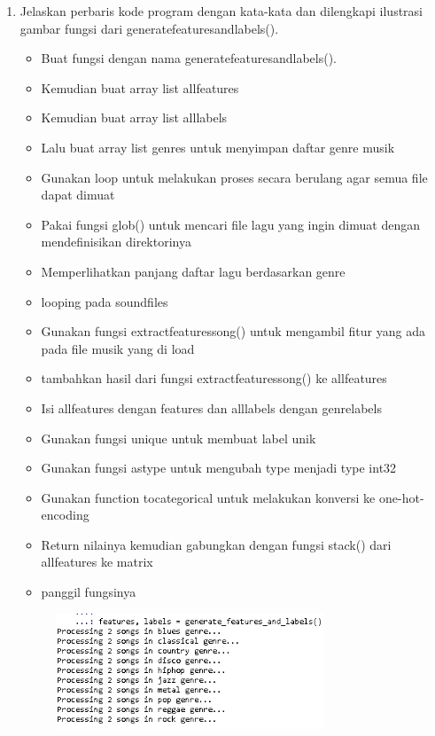 \begin{enumerate}
	\item Jelaskan perbaris kode program dengan kata-kata dan dilengkapi ilustrasi gambar fungsi dari generatefeaturesandlabels().
	\hfill\break
	
	\begin{itemize}
		\item Buat fungsi dengan nama generatefeaturesandlabels().
		\item Kemudian buat array list allfeatures
		\item Kemudian buat array list alllabels
		\item Lalu buat array list genres untuk menyimpan daftar genre musik
		\item Gunakan loop untuk melakukan proses secara berulang agar semua file dapat dimuat
		\item Pakai fungsi glob() untuk mencari file lagu yang ingin dimuat dengan mendefinisikan direktorinya
		\item Memperlihatkan panjang daftar lagu berdasarkan genre
		\item looping pada soundfiles
		\item Gunakan fungsi extractfeaturessong() untuk mengambil fitur yang ada pada file musik yang di load
		\item tambahkan hasil dari fungsi extractfeaturessong() ke allfeatures
		\item Isi allfeatures dengan features dan alllabels dengan genrelabels
		\item Gunakan fungsi unique untuk membuat label unik
		\item Gunakan fungsi astype untuk mengubah type menjadi type int32
		\item Gunakan function tocategorical untuk melakukan konversi ke one-hot-encoding
		\item Return nilainya kemudian gabungkan dengan fungsi stack() dari allfeatures ke matrix
		\item panggil fungsinya
	\end{itemize}
	\hfill\break
	\begin{figure}[H]
		\includegraphics[width=8cm]{figures/1174071/6/4.png}
		\centering

\end{figure}
\end{enumerate}
